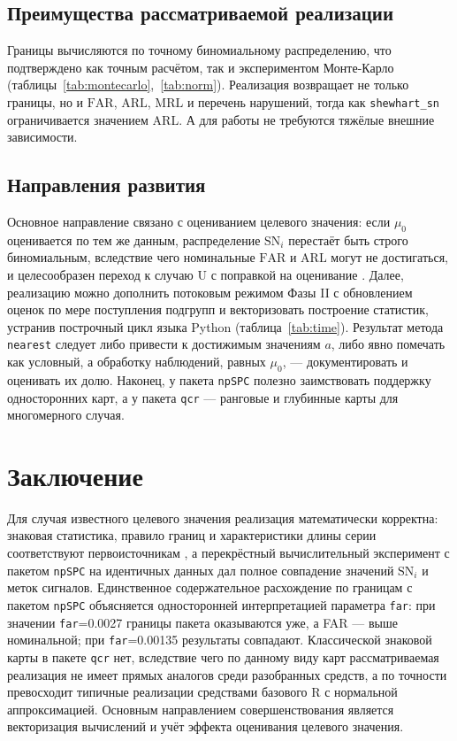 \documentclass[11pt,a4paper]{article}
\newcommand{\SN}{\mathrm{SN}}
\begin{document}
\subsection{Преимущества рассматриваемой реализации}

Границы вычисляются по точному биномиальному распределению, что подтверждено
как точным расчётом, так и экспериментом Монте-Карло
(таблицы~\ref{tab:montecarlo},~\ref{tab:norm}). Реализация возвращает не
только границы, но и $\mathrm{FAR}$, $\mathrm{ARL}$, $\mathrm{MRL}$ и
перечень нарушений, тогда как \texttt{shewhart\_sn} ограничивается значением
ARL. А для работы не требуются тяжёлые внешние зависимости.

\subsection{Направления развития}

Основное направление связано с оцениванием целевого значения: если $\mu_0$
оценивается по тем же данным, распределение $\SN_i$ перестаёт быть строго
биномиальным, вследствие чего номинальные $\mathrm{FAR}$ и $\mathrm{ARL}$
могут не достигаться, и целесообразен переход к случаю U с поправкой на
оценивание \cite{Chakraborti2019}. Далее, реализацию можно дополнить
потоковым режимом Фазы II с обновлением оценок по мере поступления подгрупп
и векторизовать построение статистик, устранив построчный цикл языка Python
(таблица~\ref{tab:time}). Результат метода \texttt{nearest} следует либо
привести к достижимым значениям $a$, либо явно помечать как условный, а
обработку наблюдений, равных $\mu_0$, --- документировать и оценивать их
долю. Наконец, у пакета \texttt{npSPC} полезно заимствовать поддержку
односторонних карт, а у пакета \texttt{qcr} ---
ранговые и глубинные карты для многомерного случая.

\section{Заключение}

Для случая известного целевого значения реализация математически корректна:
знаковая статистика, правило границ и характеристики длины серии
соответствуют первоисточникам \cite{Amin1995, Gibbons2010}, а перекрёстный
вычислительный эксперимент с пакетом \texttt{npSPC} на идентичных данных дал
полное совпадение значений $\SN_i$ и меток сигналов. Единственное
содержательное расхождение по границам с пакетом \texttt{npSPC} объясняется
односторонней интерпретацией параметра \texttt{far}: при значении
\texttt{far}=0.0027 границы пакета оказываются уже, а FAR --- выше
номинальной; при \texttt{far}=0.00135 результаты совпадают. Классической
знаковой карты в пакете \texttt{qcr} нет, вследствие чего по данному виду
карт рассматриваемая реализация не имеет прямых аналогов среди разобранных
средств, а по точности превосходит типичные реализации средствами базового
R с нормальной аппроксимацией. Основным направлением совершенствования
является векторизация вычислений и учёт эффекта оценивания целевого значения.
\end{document}
